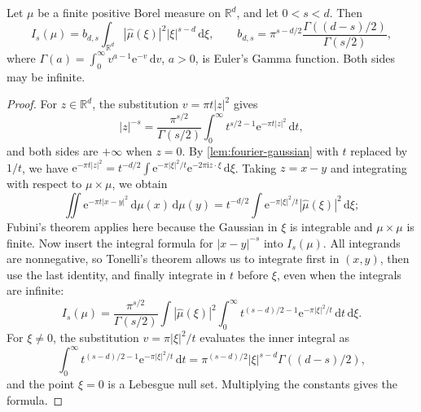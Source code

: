 \begin{theorem}\label{thm:riesz-fourier-energy}
Let $\mu$ be a finite positive Borel measure on $\mathbb R^d$, and let $0<s<d$. Then
\[
 I_s(\mu)=b_{d,s}\int_{\mathbb R^d}|\widehat\mu(\xi)|^2|\xi|^{s-d}\,\mathrm d\xi,
 \qquad b_{d,s}=\pi^{s-d/2}\frac{\Gamma((d-s)/2)}{\Gamma(s/2)},
\]
where $\Gamma(a)=\int_0^\infty v^{a-1}\mathrm e^{-v}\,\mathrm d v$, $a>0$, is Euler's Gamma function. Both sides may be infinite.
\end{theorem}
\begin{proof}
For $z\in\mathbb R^d$, the substitution $v=\pi t|z|^2$ gives
\[
 |z|^{-s}=\frac{\pi^{s/2}}{\Gamma(s/2)}\int_0^\infty t^{s/2-1}\mathrm e^{-\pi t|z|^2}\,\mathrm d t,
\]
and both sides are $+\infty$ when $z=0$. By \cref{lem:fourier-gaussian} with $t$ replaced by $1/t$, we have $\mathrm e^{-\pi t|z|^2}=t^{-d/2}\int\mathrm e^{-\pi|\xi|^2/t}\mathrm e^{-2\pi\mathrm i z\cdot\xi}\,\mathrm d\xi$. Taking $z=x-y$ and integrating with respect to $\mu\times\mu$, we obtain
\[
 \iint\mathrm e^{-\pi t|x-y|^2}\,\mathrm d\mu(x)\,\mathrm d\mu(y)
 =t^{-d/2}\int\mathrm e^{-\pi|\xi|^2/t}|\widehat\mu(\xi)|^2\,\mathrm d\xi;
\]
Fubini's theorem applies here because the Gaussian in $\xi$ is integrable and $\mu\times\mu$ is finite. Now insert the integral formula for $|x-y|^{-s}$ into $I_s(\mu)$. All integrands are nonnegative, so Tonelli's theorem allows us to integrate first in $(x,y)$, then use the last identity, and finally integrate in $t$ before $\xi$, even when the integrals are infinite:
\[
 I_s(\mu)=\frac{\pi^{s/2}}{\Gamma(s/2)}\int|\widehat\mu(\xi)|^2\int_0^\infty t^{(s-d)/2-1}\mathrm e^{-\pi|\xi|^2/t}\,\mathrm d t\,\mathrm d\xi.
\]
For $\xi\neq0$, the substitution $v=\pi|\xi|^2/t$ evaluates the inner integral as
\[
 \int_0^\infty t^{(s-d)/2-1}\mathrm e^{-\pi|\xi|^2/t}\,\mathrm d t
 =\pi^{(s-d)/2}|\xi|^{s-d}\Gamma((d-s)/2),
\]
and the point $\xi=0$ is a Lebesgue null set. Multiplying the constants gives the formula.
\end{proof}

